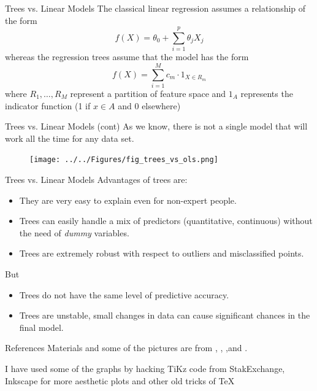 \documentclass{beamer}
\begin{document}
\begin{frame}{Trees vs. Linear Models}
	The classical linear regression assumes a relationship of the form
	\begin{equation*}
		f(X)= \theta_0 + \sum_{i=1}^p \theta_j X_j
	\end{equation*}
whereas the regression trees assume that the model has the form
\begin{equation*}
	f(X)=\sum_{i=1}^M c_m \cdot 1_{X \in R_m}
\end{equation*}
where $R_1,\ldots,R_M$ represent a partition of feature space and $1_A$ represents the indicator function (1 if $x\in A$ and 0 elsewhere)
\end{frame}

\begin{frame}{Trees vs. Linear Models (cont)}
	As we know, there is not a single model that will work all the time for any data set. 
	\begin{figure}[h]
	\centering
	\texttt{[image: ../../Figures/fig\_trees\_vs\_ols.png]}
\end{figure}	
\end{frame}

\begin{frame}{Trees vs. Linear Models}
	Advantages of trees are:
	\begin{itemize}
		\item They are very easy to explain even for non-expert people.
		\item Trees can easily handle a mix of predictors (quantitative, continuous) without the need of {\it dummy} variables.
		\item Trees are extremely robust with respect to outliers and misclassified points.
	\end{itemize}
But 
\begin{itemize}
	\item Trees do not have the same level of predictive accuracy.
	\item Trees are unstable, small changes in data can cause significant chances in the final model.
\end{itemize}
\end{frame}

\begin{frame}{References}
	Materials and some of the pictures are from \citep{James2015}, \citep{genuer}, \citep{cartbook},and \citep{geron2}.
	\printbibliography 	
	
	I have used some of the graphs by hacking TiKz code from StakExchange, Inkscape for more aesthetic plots and other old tricks of \TeX
	
\end{frame}
\end{document}
